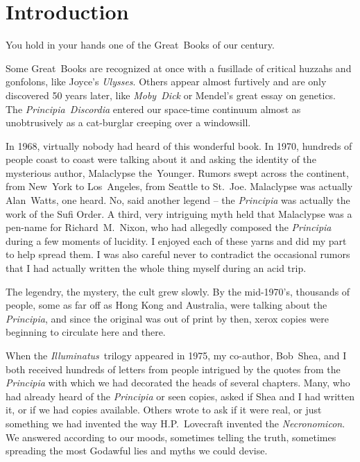 \chapter*{Introduction}

You hold in your hands one of the Great~Books of our century.

Some Great~Books are recognized at once with a fusillade of critical
huzzahs and gonfolons, like Joyce's \textit{Ulysses}. Others appear
almost furtively and are only discovered 50 years later, like
\textit{Moby~Dick} or Mendel's great essay on genetics. The
\textit{Principia~Discordia} entered our space-time continuum almost
as unobtrusively as a cat-burglar creeping over a
windowsill.

In 1968, virtually nobody had heard of this wonderful book. In 1970,
hundreds of people coast to coast were talking about it and asking the
identity of the mysterious author,
Malaclypse the~Younger. Rumors swept across the
continent, from New~York to Los~Angeles, from Seattle to
St.~Joe. Malaclypse was actually Alan~Watts, one heard. No, said
another legend -- the \textit{Principia} was actually the work of the
Sufi Order. A third, very intriguing myth held that Malaclypse was a
pen-name for Richard~M.~Nixon, who had
allegedly composed the \textit{Principia} during a few moments of
lucidity. I enjoyed each of these yarns and did my part to help spread
them. I was also careful never to contradict the occasional rumors
that I had actually written the whole thing myself during an acid
trip.

The legendry, the mystery, the cult grew slowly. By the mid-1970's,
thousands of people, some as far off as Hong Kong and Australia, were
talking about the \textit{Principia}, and since the original was out
of print by then, xerox copies were beginning to circulate here and
there.

When the \textit{Illuminatus}~trilogy appeared in 1975, my co-author,
Bob~Shea, and I both received hundreds of letters from people
intrigued by the quotes from the \textit{Principia} with which we had
decorated the heads of several chapters. Many, who had already heard
of the \textit{Principia} or seen copies, asked if Shea and I had
written it, or if we had copies available. Others wrote to ask if it
were real, or just something we had invented the way H.P.~Lovecraft
invented the \textit{Necronomicon}. We answered according to our
moods, sometimes telling the truth, sometimes spreading the most
Godawful lies and myths we could devise.

